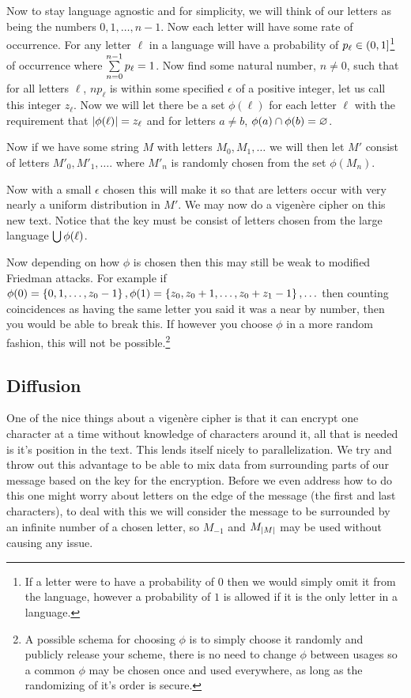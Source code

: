 \documentclass{article}
\begin{document}
	Now to stay language agnostic and for simplicity, we will think of our letters as being the numbers $0,1,\ldots,n-1$. Now each letter will have some rate of occurrence. For any letter $\ell$ in a language will have a probability of $p_\ell\in\left( {0} , {1} \right]$\footnote{If a letter were to have a probability of $0$ then we would simply omit it from the language, however a probability of $1$ is allowed if it is the only letter in a language.} of occurrence where $\sum\limits_{n=0}^{n-1}  {p_\ell}  = 1$. Now find some natural number, $n\not=0$, such that for all letters $\ell$, $np_\ell$ is within some specified $\epsilon$ of a positive integer, let us call this integer $z_\ell$. Now we will let there be a set $\phi(\ell)$ for each letter $\ell$ with the requirement that $\left| {\phi(\ell)} \right| = z_\ell$ and for letters $a\not=b$, $\phi(a)\cap \phi(b) =\varnothing$.
	
	Now if we have some string $M$ with letters $M_0, M_1, \ldots$ we will then let $M'$ consist of letters $M'_0,M'_1,\ldots$. where $M'_n$ is randomly chosen from the set $\phi(M_n)$.
	
	Now with a small $\epsilon$ chosen this will make it so that are letters occur with very nearly a uniform distribution in $M'$. We may now do a vigen\`ere cipher on this new text. Notice that the key must be consist of letters chosen from the large language $\bigcup\phi(\ell)$.
	
	Now depending on how $\phi$ is chosen then this may still be weak to modified Friedman attacks. For example if $\phi(0)=\left\{ {0,1,\ldots, z_0-1} \right\}, \phi(1) = \left\{ {z_0,z_0+1,\ldots,z_0+z_1-1} \right\}, \ldots$ then counting coincidences as having the same letter you said it was a near by number, then you would be able to break this. If however you choose $\phi$ in a more random fashion, this will not be possible.\footnote{A possible schema for choosing $\phi$ is to simply choose it randomly and publicly release your scheme, there is no need to change $\phi$ between usages so a common $\phi$ may be chosen once and used everywhere, as long as the randomizing of it's order is secure.}
	
	\subsection{Diffusion}
	One of the nice things about a vigen\`ere cipher is that it can encrypt one character at a time without knowledge of characters around it, all that is needed is it's position in the text. This lends itself nicely to parallelization. We try and throw out this advantage to be able to mix data from surrounding parts of our message based on the key for the encryption. Before we even address how to do this one might worry about letters on the edge of the message (the first and last characters), to deal with this we will consider the message to be surrounded by an infinite number of a chosen letter, so $M_{-1}$ and $M_{\left| {M} \right|}$ may be used without causing any issue.
	
\end{document}
